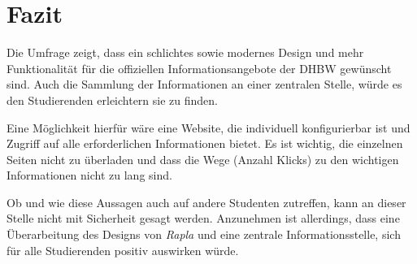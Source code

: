 \section{Fazit}
Die Umfrage zeigt, dass ein schlichtes sowie modernes Design und mehr Funktionalität für die offiziellen Informationsangebote der DHBW gewünscht sind. Auch die Sammlung der Informationen an einer zentralen Stelle, würde es den Studierenden erleichtern sie zu finden.

Eine Möglichkeit hierfür wäre eine Website, die individuell konfigurierbar ist und Zugriff auf alle erforderlichen Informationen bietet. Es ist wichtig, die einzelnen Seiten nicht zu überladen und dass die Wege (Anzahl Klicks) zu den wichtigen Informationen nicht zu lang sind.

Ob und wie diese Aussagen auch auf andere Studenten zutreffen, kann an dieser Stelle nicht mit Sicherheit gesagt werden. Anzunehmen ist allerdings, dass eine Überarbeitung des Designs von \emph{Rapla} und eine zentrale Informationsstelle, sich für alle Studierenden positiv auswirken würde.